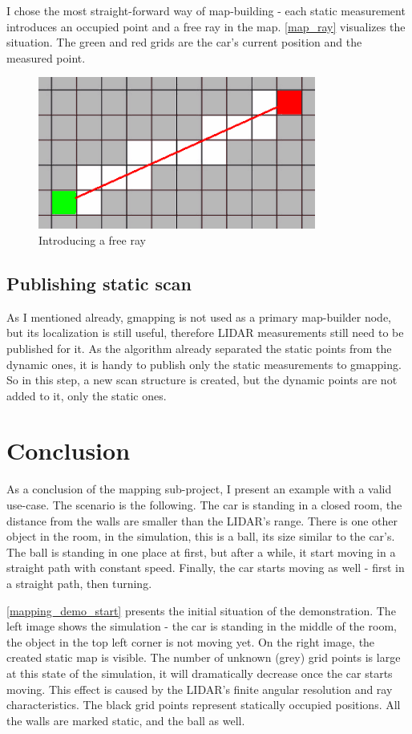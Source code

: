 I chose the most straight-forward way of map-building - each static measurement introduces an occupied point and a free ray in the map. \autoref{map_ray} visualizes the situation. The green and red grids are the car's current position and the measured point.

\begin{figure}[!ht]
    \centering
    \includegraphics[height=50mm]{figures/raw/map_ray.png}
    \caption{Introducing a free ray}
    \label{map_ray}
\end{figure}

\subsection{Publishing static scan}
As I mentioned already, gmapping is not used as a primary map-builder node, but its localization is still useful, therefore LIDAR measurements still need to be published for it. As the algorithm already separated the static points from the dynamic ones, it is handy to publish only the static measurements to gmapping. So in this step, a new scan structure is created, but the dynamic points are not added to it, only the static ones.

\section{Conclusion}
As a conclusion of the mapping sub-project, I present an example with a valid use-case. The scenario is the following. The car is standing in a closed room, the distance from the walls are smaller than the LIDAR's range. There is one other object in the room, in the simulation, this is a ball, its size similar to the car's. The ball is standing in one place at first, but after a while, it start moving in a straight path with constant speed. Finally, the car starts moving as well - first in a straight path, then turning.

\autoref{mapping_demo_start} presents the initial situation of the demonstration. The left image shows the simulation - the car is standing in the middle of the room, the object in the top left corner is not moving yet. On the right image, the created static map is visible. The number of unknown (grey) grid points is large at this state of the simulation, it will dramatically decrease once the car starts moving. This effect is caused by the LIDAR's finite angular resolution and ray characteristics. The black grid points represent statically occupied positions. All the walls are marked static, and the ball as well.

